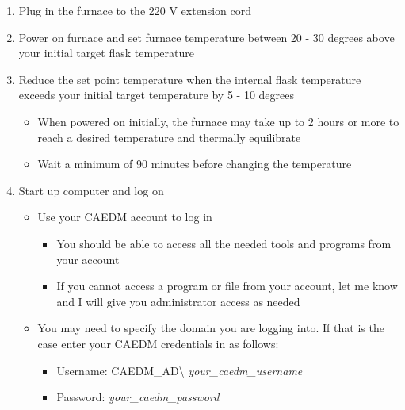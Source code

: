 \documentclass[letterpaper,11pt]{article}
\begin{document}
    \begin{enumerate}
    \item Plug in the furnace to the 220 V extension cord
    \item Power on furnace and set furnace temperature between 20 - 30 degrees 
        above your initial target flask temperature 
    \item Reduce the set point temperature when the internal flask temperature 
        exceeds your initial target temperature by 5 - 10 degrees 
        \begin{itemize}
        \item When powered on initially, the furnace may take up to 2 hours or   
            more to reach a desired temperature and thermally equilibrate
		\item Wait a minimum of 90 minutes before changing the temperature
        \end{itemize}
    
    \item Start up computer and log on
        \begin{itemize}
        \item Use your CAEDM account to log in
            \begin{itemize}
            \item You should be able to access all the needed tools and 
                programs from your account
            \item If you cannot access a program or file from your account, let 
                me know and I will give you administrator access as needed
            \end{itemize}
        
        \item You may need to specify the domain you are logging into. If that 
            is the case enter your CAEDM credentials in as follows:
            \begin{itemize}
            \item Username: CAEDM\_AD\textbackslash
            \textit{your\_caedm\_username}
            \item Password: \textit{your\_caedm\_password}
            \end{itemize}
        
        

\end{itemize}
\end{enumerate}
\end{document}
